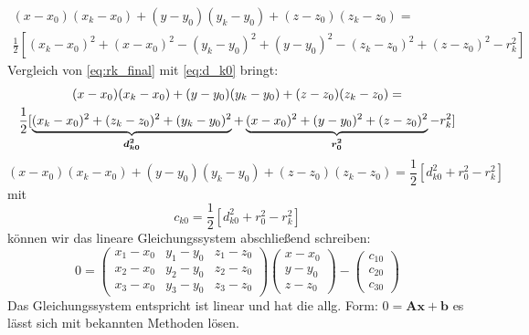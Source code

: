 \begin{multline}\label{eq:rk_final}
(x-x_0)(x_k-x_0)+(y-y_0)(y_k-y_0)+(z-z_0)(z_k-z_0)= \\\frac{1}{2}[(x_k-x_0)^2+(x-x_0)^2-(y_k-y_0)^2 +(y-y_0)^2-(z_k-z_0)^2 +(z-z_0)^2-r_k^2]
\end{multline}
%
Vergleich von \eqref{eq:rk_final} mit \eqref{eq:d_k0} bringt: 
%
\begin{multline}
(x-x_0)(x_k-x_0)+(y-y_0)(y_k-y_0)+(z-z_0)(z_k-z_0)= \\\frac{1}{2}[\underbrace{(x_k-x_0)^2+(z_k-z_0)^2+(y_k-y_0)^2}_\text{\boldmath{$d_{k0}^2$}}+\underbrace{(x-x_0)^2+(y-y_0)^2 +(z-z_0)^2}_\text{\boldmath{$r_0^2$}}-r_k^2]
\end{multline}
\begin{equation}
(x-x_0)(x_k-x_0)+(y-y_0)(y_k-y_0)+(z-z_0)(z_k-z_0)=\frac{1}{2}[d_{k0}^2+r_{0}^2-r_k^2]\label{eq:rk_final_simplyfied}
\end{equation}
mit 
\begin{equation}\label{eq:c_k0}
c_{k0}=\frac{1}{2}[d_{k0}^2+r_{0}^2-r_k^2]
\end{equation}
können wir das lineare Gleichungssystem abschließend schreiben:
%
\begin{equation}\label{eq:final_trilateration_model}
0=
\left(
	\begin{array}{ccc}
		x_1-x_0 & y_1-y_0 & z_1-z_0 \\
		x_2-x_0 & y_2-y_0 & z_2-z_0 \\
		x_3-x_0 & y_3-y_0 & z_3-z_0
	\end{array}
\right)
\left(
   \begin{array}{c}
	   x-x_0\\
	   y-y_0\\
	   z-z_0
   \end{array}
\right)
-
\left(
	\begin{array}{c}
		c_{10}\\
		c_{20}\\
		c_{30}
	\end{array}
\right)
\end{equation}
%
Das Gleichungssystem entspricht ist linear und hat die allg. Form: $0 = \mathbf{Ax}+\mathbf{b}$ es lässt sich mit bekannten Methoden lösen.



